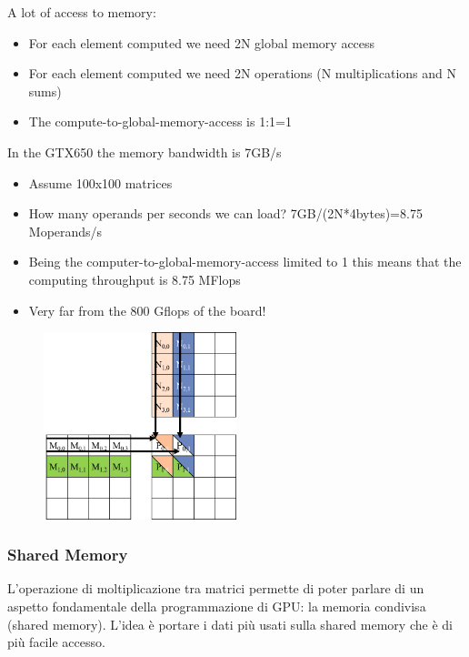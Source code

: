 A lot of access to memory:
\begin{itemize}
	\item For each element computed we need 2N global memory access
	\item For each element computed we need 2N operations (N multiplications and N sums)
	\item The compute-to-global-memory-access is 1:1=1
\end{itemize}

In the GTX650 the memory bandwidth is 7GB/s

\begin{itemize}
	\item Assume 100x100 matrices
	\item How many operands per seconds we can load? 7GB/(2N*4bytes)=8.75 Moperands/s
	\item Being the computer-to-global-memory-access limited to 1 this means that the computing throughput is 8.75 MFlops
	\item Very far from the 800 Gflops of the board!
\end{itemize}

\begin{figure}[ht]
	\centering
	\includegraphics[width=0.5\textwidth]{figure_parallel/limitations_to_computing_power.png}
\end{figure}
\FloatBarrier



\subsubsection{Shared Memory}
L'operazione di moltiplicazione tra matrici permette di poter parlare di un aspetto fondamentale della programmazione di GPU: la memoria condivisa (shared memory). L'idea è portare i dati più usati sulla shared memory che è di più facile accesso.\\

